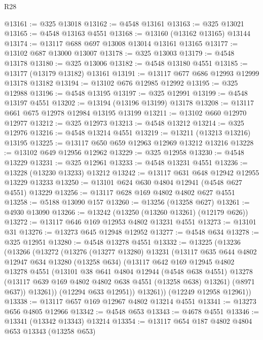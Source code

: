 \begin{lexlean}{R28}
\begin{coremodule}
@13161 := @325 @13018
@13162 := @4548 @13161
@13163 := @325 @13021
@13165 := @4548 @13163 @4551
@13168 := @13160 (@13162 @13165) @13144
@13174 := @13117 @688 @697 @13008 @13014 @13161 @13165
@13177 := @13102 @687 @13000 @13007
@13178 := @325 @13003
@13179 := @4548 @13178
@13180 := @325 @13006
@13182 := @4548 @13180 @4551
@13185 := @13177 (@13179 @13182) @13161
@13191 := @13117 @677 @686 @12993 @12999 @13178 @13182
@13194 := @13102 @676 @12985 @12992
@13195 := @325 @12988
@13196 := @4548 @13195
@13197 := @325 @12991
@13199 := @4548 @13197 @4551
@13202 := @13194 (@13196 @13199) @13178
@13208 := @13117 @661 @675 @12978 @12984 @13195 @13199
@13211 := @13102 @660 @12970 @12977
@13212 := @325 @12973
@13213 := @4548 @13212
@13214 := @325 @12976
@13216 := @4548 @13214 @4551
@13219 := @13211 (@13213 @13216) @13195
@13225 := @13117 @650 @659 @12963 @12969 @13212 @13216
@13228 := @13102 @649 @12956 @12962
@13229 := @325 @12958
@13230 := @4548 @13229
@13231 := @325 @12961
@13233 := @4548 @13231 @4551
@13236 := @13228 (@13230 @13233) @13212
@13242 := @13117 @631 @648 @12942 @12955 @13229 @13233
@13250 := @13101 @624 @630 @4804 @12941 (@4548 @627 @4551) @13229
@13256 := @13117 @628 @169 @4802 @4802 @627 @4551
@13258 := @5188 @13090 @157
@13260 := @13256 (@13258 @627)
@13261 := @4930 @13090
@13266 := @13242 (@13250 (@13260 @13261) (@12179 @626))
@13272 := @13117 @646 @169 @12953 @4802 @13231 @4551
@13273 := @13101 @31
@13276 := @13273 @645 @12948 @12952
@13277 := @4548 @634
@13278 := @325 @12951
@13280 := @4548 @13278 @4551
@13332 := @13225
    (@13236
      (@13266
        (@13272
          (@13276
            (@13277 @13280)
            @13231
            (@13117
              @635
              @644
              @4802
              @12947
              @634
              @13280
              (@13258 @634)
              (@13117
                @642
                @169
                @12945
                @4802
                @13278
                @4551
                (@13101
                  @38
                  @641
                  @4804
                  @12944
                  (@4548 @638 @4551)
                  @13278
                  (@13117 @639 @169 @4802 @4802 @638 @4551 (@13258 @638) @13261)
                  (@8971 @637))
                @13261))
            (@12294 @633 @12951))
          @13261))
      (@12249 @12958 @12961))
@13338 := @13117 @657 @169 @12967 @4802 @13214 @4551
@13341 := @13273 @656 @4805 @12966
@13342 := @4548 @653
@13343 := @4678 @4551
@13346 := @13341 (@13342 @13343) @13214
@13354 := @13117 @654 @187 @4802 @4804 @653 @13343 (@13258 @653)

\end{coremodule}
\end{lexlean}
